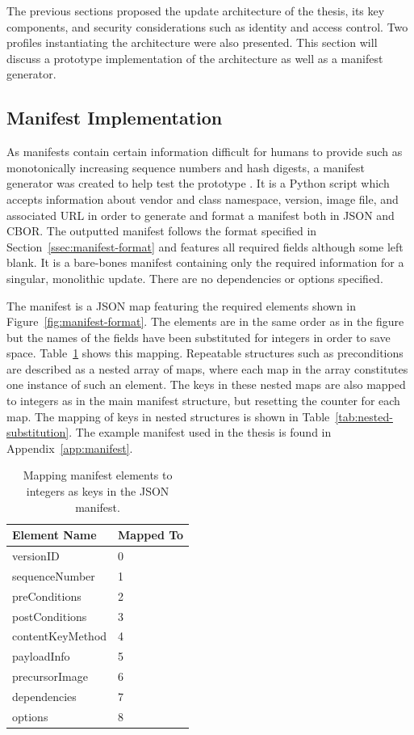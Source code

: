 \documentclass[0-thesis.tex]{subfiles}
\begin{document}
The previous sections proposed the update architecture of the thesis, its key components,
and security considerations such as identity and access control. Two profiles
instantiating the architecture were also presented. This section will discuss a prototype
implementation of the architecture as well as a manifest generator. 

\subsection{Manifest Implementation}
\label{ssec:manifest-implementation}
As manifests contain certain information difficult for humans to provide such as
monotonically increasing sequence numbers and hash digests, a manifest generator was
created to help test the prototype \parencite{manifest-generator}. It is a Python script
which accepts information about vendor and class namespace, version, image file, and
associated URL in order to generate and format a manifest both in JSON and CBOR. The
outputted manifest follows the format specified in Section~\ref{ssec:manifest-format} and
features all required fields although some left blank. It is a bare-bones manifest
containing only the required information for a singular, monolithic update. There are no
dependencies or options specified.

The manifest is a JSON map featuring the required elements shown in
Figure~\ref{fig:manifest-format}. The elements are in the same order as in the figure but
the names of the fields have been substituted for integers in order to save space.
Table~\ref{tab:manifest-substitution} shows this mapping. Repeatable structures such as
preconditions are described as a nested array of maps, where each map in the array
constitutes one instance of such an element. The keys in these nested maps are also mapped
to integers as in the main manifest structure, but resetting the counter for each map. The
mapping of keys in nested structures is shown in Table~\ref{tab:nested-substitution}. The
example manifest used in the thesis is found in Appendix~\ref{app:manifest}. 

\begin{longtable}[]{@{}ll@{}}
    \caption{Mapping manifest elements to integers as keys in the JSON manifest.}
    \label{tab:manifest-substitution}\\
    \toprule
    Element Name & Mapped To\tabularnewline
    \midrule
    \endhead
    versionID & 0\tabularnewline
    sequenceNumber & 1\tabularnewline
    preConditions & 2\tabularnewline
    postConditions & 3\tabularnewline
    contentKeyMethod & 4\tabularnewline
    payloadInfo & 5\tabularnewline
    precursorImage & 6\tabularnewline
    dependencies & 7\tabularnewline
    options & 8\tabularnewline
    \bottomrule
\end{longtable}
\end{document}
